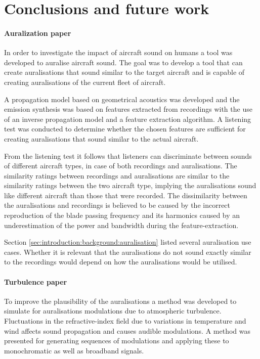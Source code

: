 \chapter{Conclusions and future work}\label{chapter:conclusions}


\subsubsection{Auralization paper}
In order to investigate the impact of aircraft sound on humans a tool was
developed to auralise aircraft sound. The goal was to develop a tool that can
create auralisations that sound similar to the target aircraft and is capable of
creating auralisations of the current fleet of aircraft.

A propagation model based on geometrical acoustics was developed and the
emission synthesis was based on features extracted from recordings with the use
of an inverse propagation model and a feature extraction algorithm. A listening
test was conducted to determine whether the chosen features are sufficient for
creating auralisations that sound similar to the actual aircraft.

From the listening test it follows that listeners can discriminate between
sounds of different aircraft types, in case of both recordings and
auralisations. The similarity ratings between recordings and auralisations are
similar to the similarity ratings between the two aircraft type, implying the
auralisations sound like different aircraft than those that were recorded.
The dissimilarity between the auralisations and recordings is believed to be
caused by the incorrect reproduction of the blade passing frequency and its
harmonics caused by an underestimation of the power and bandwidth during the
feature-extraction.

Section \ref{sec:introduction:background:auralisation} listed several
auralisation use cases. Whether it is relevant that the auralisations do not
sound exactly similar to the recordings would depend on how the auralisations
would be utilised.

\subsubsection{Turbulence paper}
To improve the plausibility of the auralisations
a method was developed to simulate for auralisations modulations
due to atmospheric turbulence. Fluctuations in the refractive-index field due to
variations in temperature and wind affects sound propagation and causes audible
modulations. A method was presented for generating sequences of modulations and
applying these to monochromatic as well as broadband signals.

